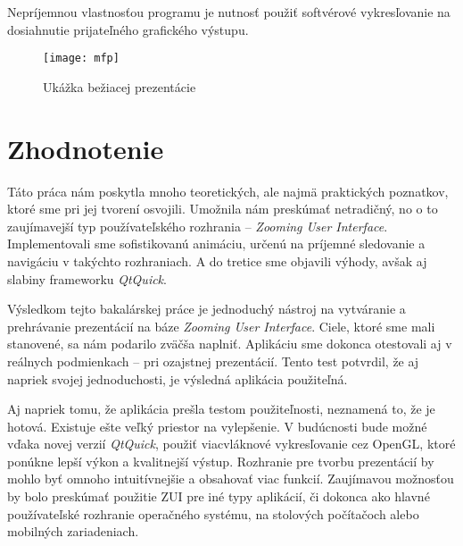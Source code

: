 Nepríjemnou vlastnosťou programu je nutnosť použiť softvérové vykresľovanie na dosiahnutie prijateľného grafického výstupu.

\begin{figure}
 \texttt{[image: mfp]}
 \caption{Ukážka bežiacej prezentácie\label{fig:mfp}} 
\end{figure}

\chapter{Zhodnotenie} \label{ch:zhodnotenie}

Táto práca nám poskytla mnoho teoretických, ale najmä praktických poznatkov, ktoré sme pri jej tvorení osvojili. Umožnila nám preskúmať netradičný, no o to zaujímavejší typ používateľského rozhrania -- \textit{Zooming User Interface}. Implementovali sme sofistikovanú animáciu, určenú na príjemné sledovanie a navigáciu v takýchto rozhraniach. A do tretice sme objavili výhody, avšak aj slabiny frameworku \textit{QtQuick}.

Výsledkom tejto bakalárskej práce je jednoduchý nástroj na vytváranie a prehrávanie prezentácií na báze \textit{Zooming User Interface}. Ciele, ktoré sme mali stanovené, sa nám podarilo zväčša naplniť. Aplikáciu sme dokonca otestovali aj v reálnych podmienkach -- pri ozajstnej prezentácií. Tento test potvrdil, že aj napriek svojej jednoduchosti, je výsledná aplikácia použiteľná.

Aj napriek tomu, že aplikácia prešla testom použiteľnosti, neznamená to, že je hotová. Existuje ešte veľký priestor na vylepšenie. V budúcnosti bude možné vďaka novej verzií \textit{QtQuick}, použiť viacvláknové vykresľovanie cez OpenGL, ktoré ponúkne lepší výkon a kvalitnejší výstup. Rozhranie pre tvorbu prezentácií by mohlo byť omnoho intuitívnejšie a obsahovať viac funkcií. Zaujímavou možnosťou by bolo preskúmať použitie ZUI pre iné typy aplikácií, či dokonca ako hlavné používateľské rozhranie operačného systému, na stolových počítačoch alebo mobilných zariadeniach.